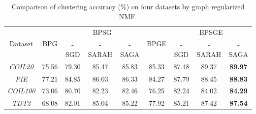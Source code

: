 \documentclass[letterpaper]{article} %
\begin{document}
	
	\begin{table}[!ht]
		\centering
		\begin{adjustbox}{max width=\textwidth}
			\begin{tabular}{c|c|c|c|c|c|c|c|c}\hline
				\multirow{2}{*}{Dataset}&\multirow{2}{*}{BPG} & \multicolumn{3}{c|}{BPSG} & \multirow{2}{*}{BPGE} & \multicolumn{3}{c}{BPSGE} \\ \cline{3-5}\cline{7-9}
				& & -SGD & -SARAH & -SAGA &  & -SGD & -SARAH & -SAGA \\\hline
				\emph{COIL20} & 75.56 &79.30& 85.47 & 85.83& 85.33& 87.48&89.37&\textbf{89.97}\\
				\emph{PIE} & 77.21 &84.85& 86.03 & 86.33& 84.27& 87.79&88.45&\textbf{88.83}\\
				\emph{COIL100} & 73.06 &80.70& 82.23 & 82.46& 76.25& 82.24&84.02&\textbf{84.29}\\
				\emph{TDT2} & 68.08 &82.01& 85.04 & 85.22& 77.92& 85.21&87.42&\textbf{87.54}\\\hline
			\end{tabular}
		\end{adjustbox}
		\caption{Comparison of clustering accuracy ($\%$)   on four datasets by graph regularized NMF.}
		\label{GNMG_clustering}
	\end{table}
	
\end{document}
